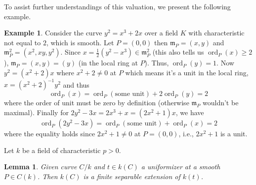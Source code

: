 \documentclass[12pt]{article}
\newtheorem{lemma}{Lemma}[subsection]
\theoremstyle{remark}
\theoremstyle{definition}
\newtheorem{example}{Example}[subsection]
\newcommand{\ord}[0]{\operatorname{ord}}
\begin{document}
            \noindent To assist further understandings of this valuation, we present the following example.
            \begin{example}
                Consider the curve $y^2=x^3+2x$ over a field $K$ with characteristic not equal to $2$, which is smooth. Let $P=(0, 0)$ then $\mathfrak m_P=(x, y)$ and $\mathfrak m_P^2=(x^2,xy,y^2)$. Since $x=\frac{1}{2}(y^2-x^3)\in\mathfrak m_P^2$ (this also tells us $\ord_P(x)\geqslant 2$), $\mathfrak m_P=(x, y)=(y)$ (in the local ring at $P$). Thus, $\ord_P(y)=1$. Now $y^2=(x^2+2)x$ where $x^2+2\neq 0$ at $P$ which means it's a unit in the local ring, $x=(x^2+2)^{-1}y^2$ and thus
                \[\ord_P(x)=\ord_P(\text{some unit})+2\ord_P(y)=2\]
                where the order of unit must be zero by definition (otherwise $\mathfrak m_P$ wouldn't be maximal). Finally for $2y^2-3x=2x^3+x=(2x^2+1)x$, we have
                \[\ord_P(2y^2-3x)=\ord_P(\text{some unit})+\ord_P(x)=2\]
                where the equality holds since $2x^2+1\neq 0$ at $P=(0, 0)$, i.e., $2x^2+1$ is a unit.
            \end{example}
            Let $k$ be a field of characteristic $p>0$.
            \begin{lemma}\label{lemma-unif-sep}
                Given curve $C/k$ and $t\in k(C)$ a uniformizer at a smooth $P\in C(k)$. Then $k(C)$ is a finite separable extension of $k(t)$.
            \end{lemma}
\end{document}
